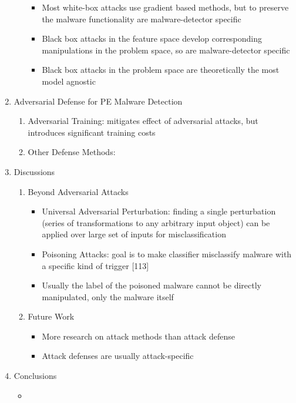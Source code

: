\documentclass{article}
\begin{document}
\begin{enumerate}
\begin{enumerate}
		\begin{itemize}
			\item Most white-box attacks use gradient based methods, but to preserve the malware functionality are malware-detector specific
			\item Black box attacks in the feature space develop corresponding manipulations in the problem space, so are malware-detector specific
			\item Black box attacks in the problem space are theoretically the most model agnostic
		\end{itemize}
	\end{enumerate}
	\item Adversarial Defense for PE Malware Detection
	\begin{enumerate}
		\item Adversarial Training: mitigates effect of adversarial attacks, but introduces significant training costs
		\item Other Defense Methods: 
	\end{enumerate}
	\item Discussions
	\begin{enumerate}
		\item Beyond Adversarial Attacks
		\begin{itemize}
			\item Universal Adversarial Perturbation: finding a single perturbation (series of transformations to any arbitrary input object) can be applied over large set of inputs for misclassification
			\item Poisoning Attacks: goal is to make classifier misclassify malware with a specific kind of trigger [113]
			\item Usually the label of the poisoned malware cannot be directly manipulated, only the malware itself
		\end{itemize}
		\item Future Work
		\begin{itemize}
			\item More research on attack methods than attack defense
			\item Attack defenses are usually attack-specific
		\end{itemize}
	\end{enumerate}
	\item Conclusions
	\begin{itemize}
		\item 
	\end{itemize}
\end{enumerate}
\pagebreak
\end{document}
